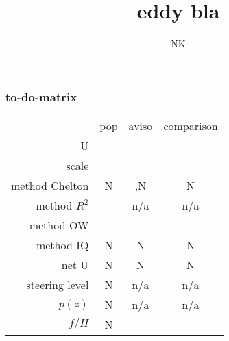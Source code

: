 \documentclass{beamer}
\begin{document}
\title{eddy bla}  
\author{NK}
%
%
%

\newcommand{\cg}[1]{\cellcolor{green!25}#1}
\newcommand{\ce}[1]{\cellcolor{red!25}#1}
\newcommand{\cb}[1]{\cellcolor{gray!25}#1}
\newcommand{\n}{n/a}
\newcommand{\citeP}{\cite{Petersen2013}}
\newcommand{\citeCs}{\cite{Chelton2007}}
\newcommand{\citeCe}{\cite{Chelton2011}}
\newcommand{\citeCes}{\cite{Chelton2011,Chelton2007}}
\begin{frame}
 \frametitle{to-do-matrix}
 \begin{tiny} 
\begin{tabular}{r|c|c|c|}
\multicolumn{1}{c}{}	& \multicolumn{1}{c}{pop}	&	\multicolumn{1}{c}{aviso}	&	\multicolumn{1}{c}{comparison}\\
\cline{2-4}
U						&	\cg{\citeP}				&		\cg{\citeCes}			&		\cg{\citeP}	\\
\cline{2-4}
scale					&	\cg{\citeP}				&		\cg{\citeCes}			&		\cg{\citeP}	\\
\cline{2-4}
method Chelton			&	\ce{N}					&		\cg{\citeCe,N}			&		\ce{N}	\\
\cline{2-4}
method $R^2$			&	\cg{\citeP}				&		\cb{\n}					&		\cb{\n}	\\
\cline{2-4}
method OW				&	\cg{\citeP}				&		\cg{\citeCs}			&		\cg{\citeP}	\\
\cline{2-4}
method IQ				&	\ce{N}					&		\ce{N}					&		\ce{N}	\\
\cline{2-4}
net U					&	\ce{N}					&		\ce{N}					&		\ce{N}	\\
\cline{2-4}
steering level			&	\ce{N}					&		\cb{\n}					&		\cb{\n}	\\
\cline{2-4}
$p(z)$					&	\ce{N}					&		\cb{\n}					&		\cb{\n}	\\
\cline{2-4}
$f/H$					&	\ce{N}					&		\ce{ }					&		\ce{ }	\\
\cline{2-4}
\end{tabular}
\def\newblock{\hskip .11em plus .33em minus .07em}


\end{tiny}
\end{frame}
\end{document}
